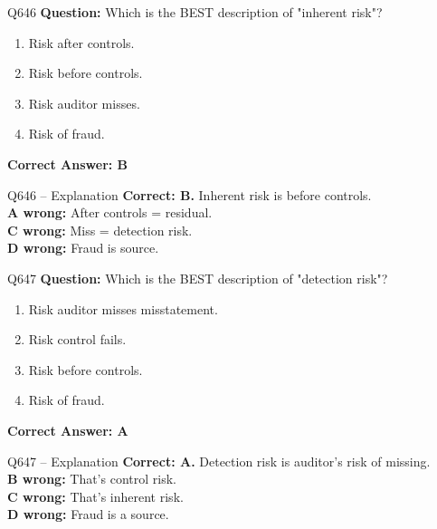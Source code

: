 \documentclass[aspectratio=169,10pt]{beamer}
\begin{document}
	\begin{frame}[t]{Q646}
		\small
		\textbf{Question:} Which is the BEST description of "inherent risk"?
		\begin{enumerate}[label=\Alph*.,itemsep=1pt,topsep=2pt]
			\item Risk after controls.
			\item Risk before controls.
			\item Risk auditor misses.
			\item Risk of fraud.
		\end{enumerate}
		\vspace{4pt}
		\textbf{Correct Answer: B}
	\end{frame}
	
	\begin{frame}[t]{Q646 -- Explanation}
		\small
		\textbf{Correct: B.} Inherent risk is before controls. \\[4pt]
		\textbf{A wrong:} After controls = residual. \\[2pt]
		\textbf{C wrong:} Miss = detection risk. \\[2pt]
		\textbf{D wrong:} Fraud is source.
	\end{frame}
	
	\begin{frame}[t]{Q647}
		\small
		\textbf{Question:} Which is the BEST description of "detection risk"?
		\begin{enumerate}[label=\Alph*.,itemsep=1pt,topsep=2pt]
			\item Risk auditor misses misstatement.
			\item Risk control fails.
			\item Risk before controls.
			\item Risk of fraud.
		\end{enumerate}
		\vspace{4pt}
		\textbf{Correct Answer: A}
	\end{frame}
	
	\begin{frame}[t]{Q647 -- Explanation}
		\small
		\textbf{Correct: A.} Detection risk is auditor's risk of missing. \\[4pt]
		\textbf{B wrong:} That's control risk. \\[2pt]
		\textbf{C wrong:} That's inherent risk. \\[2pt]
		\textbf{D wrong:} Fraud is a source.
	\end{frame}
	
\end{document}
